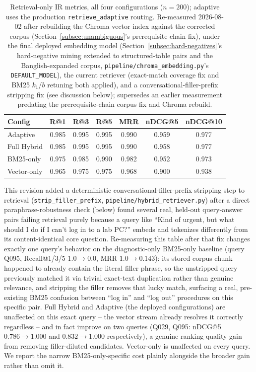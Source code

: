 \documentclass[a4paper,twoside]{article}
\begin{document}
\begin{table}[t]
\caption{Retrieval-only IR metrics, all four configurations ($n=200$); adaptive uses the production \texttt{retrieve\_adaptive} routing. Re-measured 2026-08-02 after rebuilding the Chroma vector index against the corrected corpus (Section~\ref{subsec:unambiguous}'s prerequisite-chain fix), under the final deployed embedding model (Section~\ref{subsec:hard-negatives}'s hard-negative mining extended to structured-table pairs and the Banglish-expanded corpus, \texttt{pipeline/chroma\_embedding.py}'s \texttt{DEFAULT\_MODEL}), the current retriever (exact-match coverage fix and BM25 $k_1$/$b$ retuning both applied), and a conversational-filler-prefix stripping fix (see discussion below); supersedes an earlier measurement predating the prerequisite-chain corpus fix and Chroma rebuild.}\label{tab:ir-metrics} \centering
\begin{tabular}{|l|c|c|c|c|c|c|}
\hline
Config & R@1 & R@3 & R@5 & MRR & nDCG@5 & nDCG@10 \\
\hline
Adaptive & 0.985 & 0.995 & 0.995 & 0.990 & 0.959 & 0.977 \\
Full Hybrid & 0.985 & 0.995 & 0.995 & 0.990 & 0.958 & 0.977 \\
BM25-only & 0.975 & 0.985 & 0.990 & 0.982 & 0.952 & 0.973 \\
Vector-only & 0.965 & 0.975 & 0.975 & 0.968 & 0.900 & 0.938 \\
\hline
\end{tabular}
\end{table}

This revision added a deterministic conversational-filler-prefix stripping step to retrieval (\texttt{strip\_filler\_prefix}, \texttt{pipeline/hybrid\_retriever.py}) after a direct paraphrase-robustness check (below) found several real, held-out query-answer pairs failing retrieval purely because a query like ``Kind of urgent, but what should I do if I can't log in to a lab PC?'' embeds and tokenizes differently from its content-identical core question. Re-measuring this table after that fix changes exactly one query's behavior on the diagnostic-only BM25-only baseline (query Q095, Recall@1/3/5 $1.0\to0.0$, MRR $1.0\to0.143$): its stored corpus chunk happened to already contain the literal filler phrase, so the unstripped query previously matched it via trivial exact-text duplication rather than genuine relevance, and stripping the filler removes that lucky match, surfacing a real, pre-existing BM25 confusion between ``log in'' and ``log out'' procedures on this specific pair. Full Hybrid and Adaptive (the deployed configurations) are unaffected on this exact query -- the vector stream already resolves it correctly regardless -- and in fact improve on two queries (Q029, Q095: nDCG@5 $0.786\to1.000$ and $0.832\to1.000$ respectively), a genuine ranking-quality gain from removing filler-diluted candidates. Vector-only is unaffected on every query. We report the narrow BM25-only-specific cost plainly alongside the broader gain rather than omit it.
\end{document}
